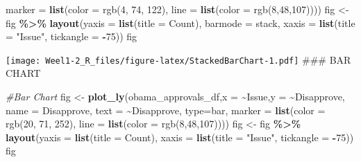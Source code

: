 \documentclass[
]{article}
\newenvironment{Shaded}{\begin{snugshade}}{\end{snugshade}}
\newcommand{\AttributeTok}[1]{\textcolor[rgb]{0.13,0.29,0.53}{#1}}
\newcommand{\CommentTok}[1]{\textcolor[rgb]{0.56,0.35,0.01}{\textit{#1}}}
\newcommand{\DecValTok}[1]{\textcolor[rgb]{0.00,0.00,0.81}{#1}}
\newcommand{\FunctionTok}[1]{\textcolor[rgb]{0.13,0.29,0.53}{\textbf{#1}}}
\newcommand{\NormalTok}[1]{#1}
\newcommand{\OtherTok}[1]{\textcolor[rgb]{0.56,0.35,0.01}{#1}}
\newcommand{\SpecialCharTok}[1]{\textcolor[rgb]{0.81,0.36,0.00}{\textbf{#1}}}
\newcommand{\StringTok}[1]{\textcolor[rgb]{0.31,0.60,0.02}{#1}}
\begin{document}
\begin{Shaded}
\begin{Highlighting}[]
                         \AttributeTok{marker =} \FunctionTok{list}\NormalTok{(}\AttributeTok{color =} \StringTok{\textquotesingle{}rgb(4, 74, 122)\textquotesingle{}}\NormalTok{,}
                                       \AttributeTok{line =} \FunctionTok{list}\NormalTok{(}\AttributeTok{color =} \StringTok{\textquotesingle{}rgb(8,48,107)\textquotesingle{}}\NormalTok{)))}
\NormalTok{fig }\OtherTok{\textless{}{-}}\NormalTok{ fig }\SpecialCharTok{\%\textgreater{}\%} \FunctionTok{layout}\NormalTok{(}\AttributeTok{yaxis =} \FunctionTok{list}\NormalTok{(}\AttributeTok{title =} \StringTok{\textquotesingle{}Count\textquotesingle{}}\NormalTok{), }\AttributeTok{barmode =} \StringTok{\textquotesingle{}stack\textquotesingle{}}\NormalTok{,}
                      \AttributeTok{xaxis =} \FunctionTok{list}\NormalTok{(}\AttributeTok{title =} \StringTok{"Issue"}\NormalTok{, }\AttributeTok{tickangle =} \SpecialCharTok{{-}}\DecValTok{75}\NormalTok{))}
\NormalTok{fig}
\end{Highlighting}
\end{Shaded}

\texttt{[image: Weel1-2\_R\_files/figure-latex/StackedBarChart-1.pdf]}
\#\#\# BAR CHART

\begin{Shaded}
\begin{Highlighting}[]
\CommentTok{\#Bar Chart}
\NormalTok{fig }\OtherTok{\textless{}{-}} \FunctionTok{plot\_ly}\NormalTok{(obama\_approvals\_df,}\AttributeTok{x =} \SpecialCharTok{\textasciitilde{}}\NormalTok{Issue,}\AttributeTok{y =} \SpecialCharTok{\textasciitilde{}}\NormalTok{Disapprove, }\AttributeTok{name =} \StringTok{\textquotesingle{}Disapprove\textquotesingle{}}\NormalTok{,}
               \AttributeTok{text =} \SpecialCharTok{\textasciitilde{}}\NormalTok{Disapprove, }\AttributeTok{type=}\StringTok{\textquotesingle{}bar\textquotesingle{}}\NormalTok{,}
               \AttributeTok{marker =} \FunctionTok{list}\NormalTok{(}\AttributeTok{color =} \StringTok{\textquotesingle{}rgb(20, 71, 252)\textquotesingle{}}\NormalTok{,}
                             \AttributeTok{line =} \FunctionTok{list}\NormalTok{(}\AttributeTok{color =} \StringTok{\textquotesingle{}rgb(8,48,107)\textquotesingle{}}\NormalTok{))) }
\NormalTok{fig }\OtherTok{\textless{}{-}}\NormalTok{ fig }\SpecialCharTok{\%\textgreater{}\%} \FunctionTok{layout}\NormalTok{(}\AttributeTok{yaxis =} \FunctionTok{list}\NormalTok{(}\AttributeTok{title =} \StringTok{\textquotesingle{}Count\textquotesingle{}}\NormalTok{),}
                      \AttributeTok{xaxis =} \FunctionTok{list}\NormalTok{(}\AttributeTok{title =} \StringTok{"Issue"}\NormalTok{, }\AttributeTok{tickangle =} \SpecialCharTok{{-}}\DecValTok{75}\NormalTok{))}
\NormalTok{fig}
\end{Highlighting}
\end{Shaded}
\end{document}

